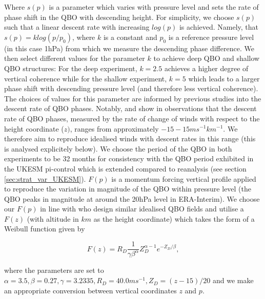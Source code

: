Where $s(p)$ is a parameter which varies with pressure level and sets the rate of phase shift in the QBO with descending height. For simplicity, we choose $s(p)$ such that a linear descent rate with increasing $log(p)$ is achieved. Namely, that $s(p) = k log(p/p_{0})$, where $k$ is a constant and $p_{0}$ is a reference pressure level (in this case 1hPa) from which we measure the descending phase difference. We then select different values for the parameter $k$ to achieve deep QBO and shallow QBO structures: For the deep experiment, $k = 2.5$ achieves a higher degree of vertical coherence while for the shallow experiment, $k = 5$ which leads to a larger phase shift with descending pressure level (and therefore less vertical coherence). The choices of values for this parameter are informed by previous studies into the descent rate of QBO phases. Notably, \cite{kinnersleyDescent1996} and \cite{coySeasonal2020} show in observations that the descent rate of QBO phases, measured by the rate of change of winds with respect to the height coordinate ($z)$, ranges from approximately $-15-15ms^{-1}km^{-1}$. We therefore aim to reproduce idealised winds with descent rates in this range (this is analysed explicitely below). We choose the period of the QBO in both experiments to be 32 months for consistency with the QBO period exhibited in the UKESM pi-control which is extended compared to reanalysis (see section \ref{sec:strat_var_UKESM}). $F(p)$ is a momentum forcing vertical profile applied to reproduce the variation in magnitude of the QBO within pressure level (the QBO peaks in magnitude at around the 20hPa level in ERA-Interim). We choose our $F(p)$ in line with \cite{pascoeQuasibiennial2005b} who design similar idealised QBO fields and utilise a $F(z)$ (with altitude in $km$ as the height coordinate) which takes the form of a Weibull function given by

\begin{equation} \label{eq:vertical_profile}
F(z) = R_D \frac{1}{\gamma \beta^\alpha}  Z_D^{\alpha-1}  e^{-Z_D/\beta},
\end{equation}

where the parameters are set to $\alpha = 3.5, \beta = 0.27, \gamma = 3.2335, R_D = 40.0 ms^{-1}, Z_{D} = (z - 15)/20$ and we make an appropriate conversion between vertical coordinates $z$ and $p$.

